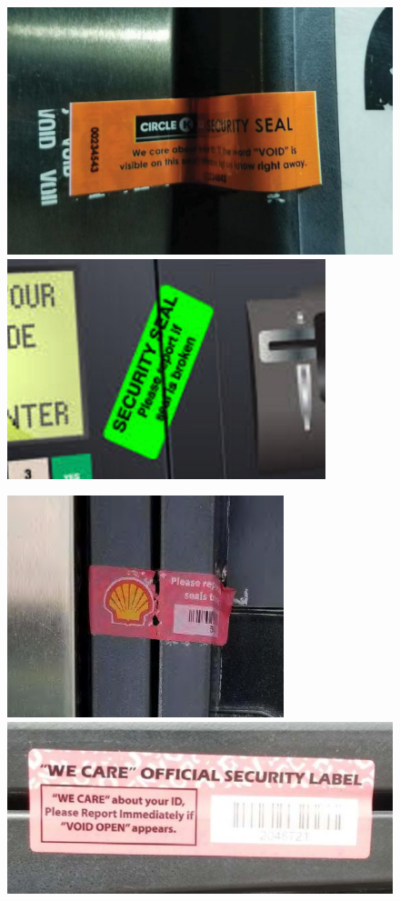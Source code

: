 \begin{figure}
    \centering
    \begin{minipage}{\linewidth}
        \includegraphics[height=0.33\linewidth,width=0.495\linewidth]{fig/branded_seal_untampered.png}\hfill
        \includegraphics[height=0.33\linewidth,width=0.495\linewidth]{fig/unbranded_untampered.png}
    \end{minipage}
    \vskip1pt
    \begin{minipage}{\linewidth}
        \includegraphics[height=0.33\linewidth,width=0.495\linewidth]{fig/branded_tampered_seal.png}\hfill
        \includegraphics[height=0.33\linewidth,width=0.495\linewidth]{fig/unbranded_tampered_seal.png}
    \end{minipage}
    \vskip1pt

\end{figure}
